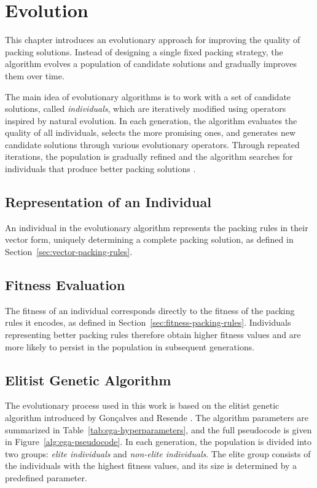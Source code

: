 \chapter{Evolution}
\label{chap:evolution}

This chapter introduces an evolutionary approach for improving the quality of packing solutions. 
Instead of designing a single fixed packing strategy, the algorithm evolves a population of candidate solutions and gradually improves them over time.

The main idea of evolutionary algorithms is to work with a set of candidate solutions, called \emph{individuals}, which are iteratively modified using operators inspired by natural evolution. 
In each generation, the algorithm evaluates the quality of all individuals, selects the more promising ones, and generates new candidate solutions through various evolutionary operators.
Through repeated iterations, the population is gradually refined and the algorithm searches for individuals that produce better packing solutions \cite{eiben2016}.

\section{Representation of an Individual}

An individual in the evolutionary algorithm represents the packing rules in their vector form, uniquely determining a complete packing solution, as defined in Section~\ref{sec:vector-packing-rules}.

\section{Fitness Evaluation}

The fitness of an individual corresponds directly to the fitness of the packing rules it encodes, as defined in Section~\ref{sec:fitness-packing-rules}.
Individuals representing better packing rules therefore obtain higher fitness values and are more likely to persist in the population in subsequent generations.

\section{Elitist Genetic Algorithm}

The evolutionary process used in this work is based on the elitist genetic algorithm introduced by Gonçalves and Resende \cite{goncalves2013}. 
The algorithm parameters are summarized in Table~\ref{tab:ega-hyperparameters}, and the full pseudocode is given in Figure~\ref{alg:ega-pseudocode}. 
In each generation, the population is divided into two groups: \emph{elite individuals} and \emph{non-elite individuals}. 
The elite group consists of the individuals with the highest fitness values, and its size is determined by a predefined parameter.

